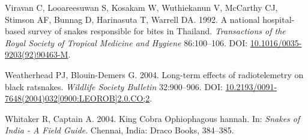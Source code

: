 \documentclass[10pt,a4paper]{article}
\newlength{\cslhangindent}
\newenvironment{CSLReferences}[2] %
 {\begin{list}{}{%
  \setlength{\itemindent}{0pt}
  \setlength{\leftmargin}{0pt}
  \setlength{\parsep}{0pt}
  \ifodd #1
   \setlength{\leftmargin}{\cslhangindent}
   \setlength{\itemindent}{-1\cslhangindent}
  \fi
  \setlength{\itemsep}{#2\baselineskip}}}
 {\end{list}}
\begin{document}
\begin{CSLReferences}{1}{0}
Viravan C, Looareesuwan S, Kosakam W, Wuthiekanun V, McCarthy CJ, Stimson AF, Bunnag D, Harinasuta T, Warrell DA. 1992. A national hospital-based survey of snakes responsible for bites in {Thailand}. \emph{Transactions of the Royal Society of Tropical Medicine and Hygiene} 86:100--106. DOI: \href{https://doi.org/10.1016/0035-9203(92)90463-M}{10.1016/0035-9203(92)90463-M}.

Weatherhead PJ, Blouin-Demers G. 2004. Long-term effects of radiotelemetry on black ratsnakes. \emph{Wildlife Society Bulletin} 32:900--906. DOI: \href{https://doi.org/10.2193/0091-7648(2004)032\%5B0900:LEOROB\%5D2.0.CO;2}{10.2193/0091-7648(2004)032{[}0900:LEOROB{]}2.0.CO;2}.

Whitaker R, Captain A. 2004. King {Cobra} {Ophiophagous} hannah. In: \emph{Snakes of {India} - {A} {Field} {Guide}}. Chennai, India: Draco Books, 384--385.

\end{CSLReferences}
\end{document}
